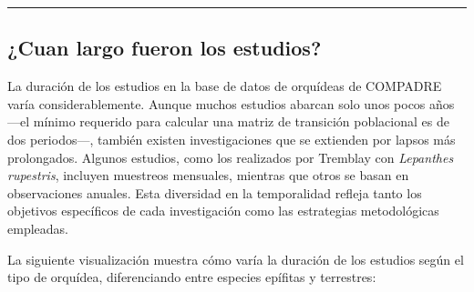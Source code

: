 \documentclass[
  12pt,
  letterpaper,
]{book}
\begin{document}
\begin{center}\rule{0.5\linewidth}{0.5pt}\end{center}

\subsection{¿Cuan largo fueron los
estudios?}\label{cuan-largo-fueron-los-estudios}

La duración de los estudios en la base de datos de orquídeas de COMPADRE
varía considerablemente. Aunque muchos estudios abarcan solo unos pocos
años ---el mínimo requerido para calcular una matriz de transición
poblacional es de dos periodos---, también existen investigaciones que
se extienden por lapsos más prolongados. Algunos estudios, como los
realizados por Tremblay con \emph{Lepanthes rupestris}, incluyen
muestreos mensuales, mientras que otros se basan en observaciones
anuales. Esta diversidad en la temporalidad refleja tanto los objetivos
específicos de cada investigación como las estrategias metodológicas
empleadas.

La siguiente visualización muestra cómo varía la duración de los
estudios según el tipo de orquídea, diferenciando entre especies
epífitas y terrestres:
\end{document}
